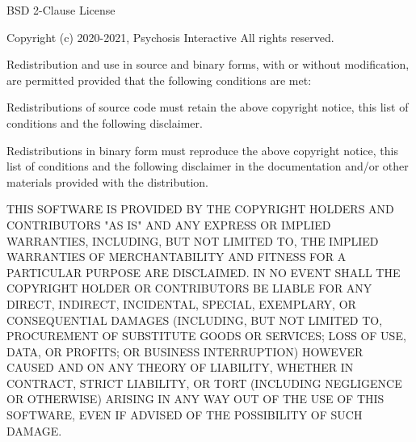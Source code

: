 \begin{DoxyCode}
BSD 2-Clause License

Copyright (c) 2020-2021, Psychosis Interactive All rights reserved.

Redistribution and use in source and binary forms, with or without modification, are permitted provided
       that the following conditions are met:

Redistributions of source code must retain the above copyright notice, this list of conditions and the
       following disclaimer.

Redistributions in binary form must reproduce the above copyright notice, this list of conditions and the
       following disclaimer in the documentation and/or other materials provided with the distribution.

THIS SOFTWARE IS PROVIDED BY THE COPYRIGHT HOLDERS AND CONTRIBUTORS "AS IS" AND ANY EXPRESS OR IMPLIED
       WARRANTIES, INCLUDING, BUT NOT LIMITED TO, THE IMPLIED WARRANTIES OF MERCHANTABILITY AND FITNESS FOR A
       PARTICULAR PURPOSE ARE DISCLAIMED. IN NO EVENT SHALL THE COPYRIGHT HOLDER OR CONTRIBUTORS BE LIABLE FOR ANY DIRECT,
       INDIRECT, INCIDENTAL, SPECIAL, EXEMPLARY, OR CONSEQUENTIAL DAMAGES (INCLUDING, BUT NOT LIMITED TO,
       PROCUREMENT OF SUBSTITUTE GOODS OR SERVICES; LOSS OF USE, DATA, OR PROFITS; OR BUSINESS INTERRUPTION) HOWEVER CAUSED
       AND ON ANY THEORY OF LIABILITY, WHETHER IN CONTRACT, STRICT LIABILITY, OR TORT (INCLUDING NEGLIGENCE OR
       OTHERWISE) ARISING IN ANY WAY OUT OF THE USE OF THIS SOFTWARE, EVEN IF ADVISED OF THE POSSIBILITY OF SUCH DAMAGE.
\end{DoxyCode}
 
